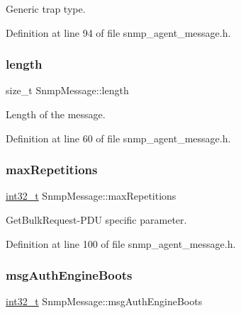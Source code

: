 Generic trap type. 



Definition at line 94 of file snmp\+\_\+agent\+\_\+message.\+h.

\mbox{\label{structSnmpMessage_a93c0a098352c158e9dba13bbd023e0fd}} 
\subsubsection{\texorpdfstring{length}{length}}
{\footnotesize\ttfamily size\+\_\+t Snmp\+Message\+::length}



Length of the message. 



Definition at line 60 of file snmp\+\_\+agent\+\_\+message.\+h.

\mbox{\label{structSnmpMessage_afa0f8f0e8eb0a126a401704cef25d3d3}} 
\subsubsection{\texorpdfstring{max\+Repetitions}{maxRepetitions}}
{\footnotesize\ttfamily \hyperlink{stdint_8h_ab1967d8591af1a4e48c37fd2b0f184d0}{int32\+\_\+t} Snmp\+Message\+::max\+Repetitions}



Get\+Bulk\+Request-\/\+P\+DU specific parameter. 



Definition at line 100 of file snmp\+\_\+agent\+\_\+message.\+h.

\mbox{\label{structSnmpMessage_ac21a9a3e133f918bda8d8a9333609621}} 
\subsubsection{\texorpdfstring{msg\+Auth\+Engine\+Boots}{msgAuthEngineBoots}}
{\footnotesize\ttfamily \hyperlink{stdint_8h_ab1967d8591af1a4e48c37fd2b0f184d0}{int32\+\_\+t} Snmp\+Message\+::msg\+Auth\+Engine\+Boots}



